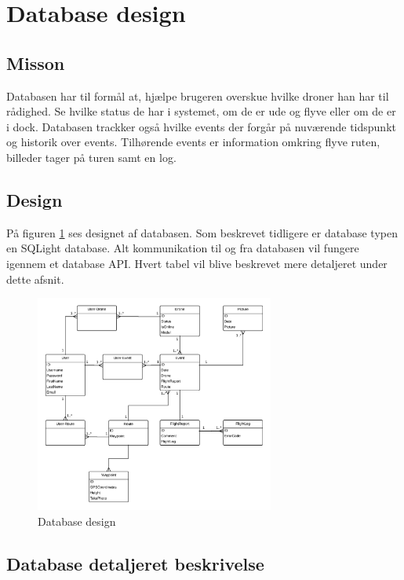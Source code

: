 \section{Database design}

\subsection{Misson}
Databasen har til formål at, hjælpe brugeren overskue hvilke droner han har til rådighed. Se hvilke status de har i systemet, om de er ude og flyve eller om de er i dock. Databasen trackker også hvilke events der forgår på nuværende tidspunkt og historik over events. Tilhørende events er information omkring flyve ruten, billeder tager på turen samt en log.

\subsection{Design}
På figuren \ref{fig:database_design} ses designet af databasen. Som beskrevet tidligere er database typen en SQLight database. Alt kommunikation til og fra databasen vil fungere igennem et database API. Hvert tabel vil blive beskrevet mere detaljeret under dette afsnit.

\vspace{-5pt}
\begin{figure}[H]
	\centering
	\includegraphics[width=0.7\textwidth]{Billeder/database/database_design.png}
	\vspace{-5pt}
	\caption{Database design}
	\label{fig:database_design}
\end{figure}

\newpage
\subsection{Database detaljeret beskrivelse}

